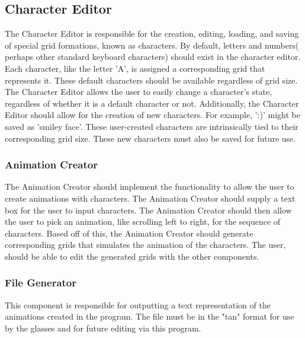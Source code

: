 \documentclass[12pt]{article}
\begin{document}
	\subsection { Character Editor}
  	The Character Editor is responsible for the creation, editing, loading, and saving of special grid formations, known as characters. By default, letters and numbers( perhaps other standard keyboard characters) should exist in the character editor. Each character, like the letter 'A', is assigned a corresponding grid that represents it.	
  	These default characters should be available regardless of grid size. The Character Editor allows the user to easily change a character's state, regardless of whether it is a default character or not.	
  	Additionally, the Character Editor should allow for the creation of new characters. For example, ':)' might be saved as 'smiley face'. These user-created characters are intrinsically tied to their corresponding grid size. These new characters must also be saved for future use.
	
	\subsubsection{Animation Creator}
  	The Animation Creator should implement the functionality to allow the user to create animations with characters. The Animation Creator should supply a text box for the user to input characters. The Animation Creator should then allow the user to pick an animation, like scrolling left to right, for the sequence of characters.	
  	Based off of this, the Animation Creator should generate corresponding grids that simulates the animation of the characters. The user, should be able to edit the generated grids with the other components. 
	
	\subsubsection{File Generator}
  	This component is responsible for outputting a text representation of the animations created in the program. The file must be in the "tan" format for use by the glasses and for future editing via this program.
	
\end{document}
